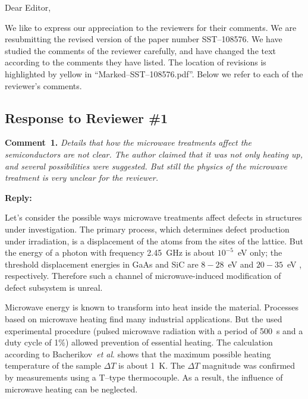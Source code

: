 \documentclass[10pt]{iopart}
\begin{document}
Dear Editor,

We like to express our appreciation to the reviewers for their comments.
We are resubmitting the revised version of the paper number SST--108576.
We have studied the comments of the reviewer carefully, and have changed the text according to the comments they
have listed.
The location of revisions is  highlighted by yellow in ``Marked--SST--108576.pdf''.
Below we refer to each of the reviewer’s comments.



\subsection*{Response to Reviewer \#1 }

\noindent
\textcolor[rgb]{0.00,0.50,1.00}{\textbf{Comment~1.}}
\emph{Details that how the microwave treatments affect the semiconductors are not clear.
The author claimed that it was not only heating up, and several possibilities were suggested.
But still the physics of the microwave treatment is very unclear for the reviewer.}

\noindent
\textcolor[rgb]{0.51,0.00,0.00}{\textbf{Reply:}}

Let's consider the possible ways microwave treatments affect defects in structures under investigation.
The primary process, which determines defect production under irradiation,
is a displacement of the atoms from the sites of the lattice.
But the energy of a photon with frequency 2.45~GHz is about $10^{-5}$~eV only;
the threshold displacement energies in GaAs and SiC are $8-28$~eV \cite{Ed:GaAs} and $20-35$~eV \cite{Ed:SiC}, respectively.
Therefore such a channel of microwave-induced modification of defect subsystem is unreal.

Microwave energy is known to transform into heat inside the material.
Processes based on microwave heating find many industrial applications.
But the used experimental procedure
(pulsed microwave radiation with a period of 500~s and a duty cycle of 1\%)
allowed prevention of essential heating.
The calculation according to Bacherikov~\emph{et al}. \cite{Bacherikov2008En} shows that
the maximum possible heating temperature of the sample $\Delta T$ is about 1~K.
The $\Delta T$ magnitude was confirmed by measurements using a T--type thermocouple.
As a result, the influence of microwave heating can be neglected.
\end{document}
